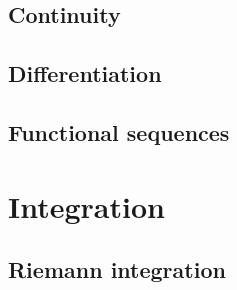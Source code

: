 \documentclass{../note}
\begin{document}
\chapter{Continuity}

\chapter{Differentiation}

\chapter{Functional sequences}


\part{Integration}

\chapter{Riemann integration}
\end{document}
